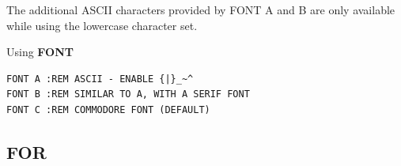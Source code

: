 \begin{description}[leftmargin=2cm,style=nextline]
\item [Remarks:] The additional ASCII characters provided by FONT A and B are only available
  while using the lowercase character set.

\item [Examples:] Using {\bf FONT}
\begin{tcolorbox}[colback=black,coltext=white]
\begin{verbatim}
FONT A :REM ASCII - ENABLE {|}_~^
FONT B :REM SIMILAR TO A, WITH A SERIF FONT
FONT C :REM COMMODORE FONT (DEFAULT)
\end{verbatim}
\end{tcolorbox}
\end{description}


\newpage
\subsection{FOR}
